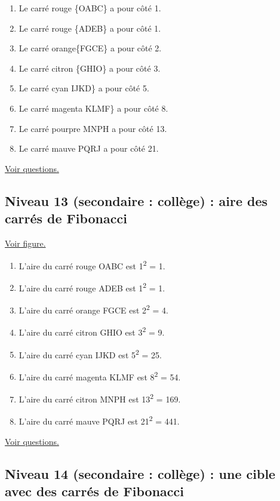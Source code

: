 \documentclass[11pt]{article}
\begin{document}
\begin{enumerate}
\item Le carré rouge \{OABC\} a pour côté 1.
\item Le carré rouge \{ADEB\} a pour côté 1.
\item Le carré orange\{FGCE\} a pour côté 2.
\item Le carré citron \{GHIO\} a pour côté 3.
\item Le carré cyan IJKD\} a pour côté 5.
\item Le carré magenta KLMF\} a pour côté 8.
\item Le carré pourpre MNPH a pour côté 13.
\item Le carré mauve PQRJ a pour côté 21.
\end{enumerate}


\hyperref[orgfc1cc9c]{Voir questions.}


\newpage


\subsection{Niveau 13 (secondaire : collège) : aire des carrés de Fibonacci}
\label{sec:org4d288be}

\label{org50613b0}

\hyperref[orgfb1884a]{Voir figure.}

\begin{enumerate}
\item L'aire du carré rouge OABC est 1\textsuperscript{2} = 1.
\item L'aire du carré rouge ADEB est 1\textsuperscript{2} = 1.
\item L'aire du carré orange FGCE est 2\textsuperscript{2} = 4.
\item L'aire du carré citron GHIO est 3\textsuperscript{2} = 9.
\item L'aire du carré cyan IJKD est 5\textsuperscript{2} = 25.
\item L'aire du carré magenta KLMF est 8\textsuperscript{2} = 54.
\item L'aire du carré citron MNPH est 13\textsuperscript{2} = 169.
\item L'aire du carré mauve PQRJ est 21\textsuperscript{2} = 441.
\end{enumerate}

\hyperref[org2715b85]{Voir questions.}


\newpage


\subsection{Niveau 14 (secondaire : collège) : une cible avec des carrés de Fibonacci}
\label{sec:org237ac74}
\label{org58e32e4}
\end{document}
